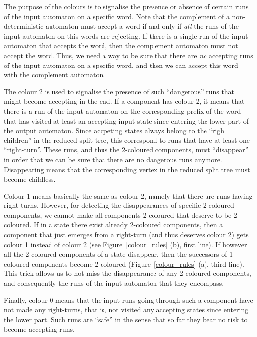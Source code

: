 The purpose of the colours is to signalise the presence or absence of certain runs of the input automaton on a specific word. Note that the complement of a non-deterministic automaton must accept a word if and only if \textit{all} the runs of the input automaton on this words are rejecting. If there is a single run of the input automaton that accepts the word, then the complement automaton must not accept the word. Thus, we need a way to be sure that there are \textit{no} accepting runs of the input automaton on a specific word, and then we can accept this word with the complement automaton. 

The colour 2 is used to signalise the presence of such ``dangerous'' runs that might become accepting in the end. If a component has colour 2, it means that there is a run of the input automaton on the corresponding prefix of the word that has visited at least an accepting input-state since entering the lower part of the output automaton. Since accpeting states always belong to the ``righ children'' in the reduced split tree, this correspond to runs that have at least one ``right-turn''. These runs, and thus the 2-coloured components, must ``disappear'' in order that we can be sure that there are no dangerous runs anymore. Disappearing means that the corresponding vertex in the reduced split tree must become childless.

Colour 1 means basically the same as colour 2, namely that there are runs having right-turns. However, for detecting the disappearances of specific 2-coloured components, we cannot make all components 2-coloured that deserve to be 2-coloured. If in a state there exist already 2-coloured components, then a component that just emerges from a right-turn (and thus deserves colour 2) gets colour 1 instead of colour 2 (see Figure~\ref{colour_rules} (b), first line). If however all the 2-coloured components of a state disappear, then the successors of 1-coloured components become 2-coloured (Figure~\ref{colour_rules} (a), third line). This trick allows us to not miss the disappearance of any 2-coloured components, and consequently the runs of the input automaton that they encompass.

Finally, colour 0 means that the input-runs going through such a component have not made any right-turns, that is, not visited any accepting states since entering the lower part. Such runs are ``safe'' in the sense that so far they bear no risk to become accepting runs.






